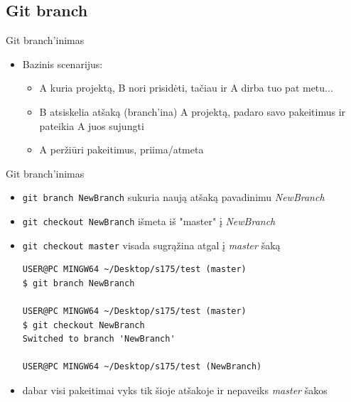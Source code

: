 \documentclass[11pt,xcolor=table]{beamer}
\begin{document}
\subsection{Git branch}

\begin{frame}[fragile]{Git branch'inimas}
\begin{itemize}
\item Bazinis scenarijus:
\begin{itemize}
\item A kuria projektą, B nori prisidėti, tačiau ir A dirba tuo pat metu...
\item B atsiskelia atšaką (branch'ina) A projektą, padaro savo pakeitimus ir pateikia A juos sujungti
\item A peržiūri pakeitimus, priima/atmeta
\end{itemize}
\end{itemize}
\end{frame}

\begin{frame}[fragile]{Git branch'inimas}
\begin{itemize}

\item \colorbox{listinggray}{\lstinline|git branch NewBranch|}  sukuria naują atšaką pavadinimu \textit{NewBranch}
\item \colorbox{listinggray}{\lstinline|git checkout NewBranch|} išmeta iš "master" į \textit{NewBranch}
\item \colorbox{listinggray}{\lstinline|git checkout master|} visada sugrąžina atgal į \textit{master} šaką

\begin{lstlisting}
USER@PC MINGW64 ~/Desktop/s175/test (master)
$ git branch NewBranch

USER@PC MINGW64 ~/Desktop/s175/test (master)
$ git checkout NewBranch
Switched to branch 'NewBranch'

USER@PC MINGW64 ~/Desktop/s175/test (NewBranch)

\end{lstlisting}

\item dabar visi pakeitimai vyks tik šioje atšakoje ir nepaveiks \textit{master} šakos
\end{itemize}
\end{frame}
\end{document}
